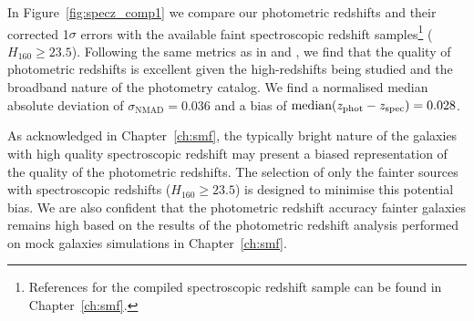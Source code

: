 In Figure~\ref{fig:specz_comp1} we compare our photometric redshifts and their corrected 1$\sigma$ errors with the available faint spectroscopic redshift samples\footnote{References for the compiled spectroscopic redshift sample can be found in Chapter~\ref{ch:smf}.} ($H_{160} \geq 23.5$). Following the same metrics as in \citet{Molino:2014iz} and , we find that the quality of photometric redshifts is excellent given the high-redshifts being studied and the broadband nature of the photometry catalog. We find a normalised median absolute deviation of $\sigma_{\text{NMAD}} = 0.036$ and a bias of $\text{median}(z_{\rm{phot}} - z_{\rm{spec}}) = 0.028$.

As acknowledged in Chapter~\ref{ch:smf}, the typically bright nature of the galaxies with high quality spectroscopic redshift may present a biased representation of the quality of the photometric redshifts. The selection of only the fainter sources with spectroscopic redshifts ($H_{160} \geq 23.5$) is designed to minimise this potential bias. We are also confident that the photometric redshift accuracy fainter galaxies remains high based on the results of the photometric redshift analysis performed on mock galaxies simulations in Chapter~\ref{ch:smf}.

